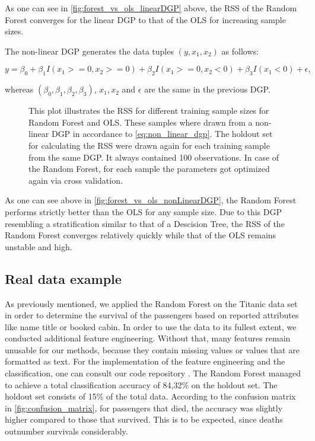 As one can see in \autoref{fig:forest_vs_ols_linearDGP} above, the RSS of the Random Forest converges for the linear DGP
to that of the OLS for increasing sample sizes. 

The non-linear DGP generates the data tuples \( (y, x_{1}, x_{2}) \) as follows:

\begin{equation}\label{eq:non_linear_dgp}
    y = \beta_{0} + \beta_{1} I(x_{1} >= 0, x_{2} >= 0) + \beta_{2} I(x_{1} >= 0, x_{2} < 0) + \beta_{3} I(x_{1} < 0) + \epsilon,
\end{equation}

whereas \( (\beta_{0}, \beta_{1}, \beta_{2}, \beta_{3}) \), \( x_{1}, x_{2} \) and \(  \epsilon \)
are the same in the previous DGP.

\begin{figure}[H]
    \captionsetup{format=plain}
    \caption
        {This plot illustrates the RSS for different training sample sizes for Random Forest and OLS.
        These samples where drawn from a non-linear DGP in accordance to \autoref{eq:non_linear_dgp}.
        The holdout set for calculating the RSS were drawn again for each training sample from the same DGP.
        It always contained 100 observations. In case of the Random Forest, for each sample the parameters
        got optimized again via cross validation.
        }
    \label{fig:forest_vs_ols_nonLinearDGP}
\end{figure}

As one can see above in \autoref{fig:forest_vs_ols_nonLinearDGP}, the Random Forest performs strictly better
than the OLS for any sample size. Due to this DGP resembling a stratification similar to
that of a Descision Tree, the RSS of the Random Forest converges relatively quickly while that of the OLS
remains unstable and high. 


\subsection{Real data example}
\label{sec:real_data}
As previously mentioned, we applied the Random Forest on the Titanic data set \cite{titanicData} in order
to determine the survival of the passengers based on reported attributes like name title or booked cabin. 
In order to use the data to its fullest extent, we conducted additional feature engineering. Without that, many
features remain unusable for our methods, because they contain missing values or values that are formatted as text.
For the implementation of the feature engineering and the classification, one can consult our code repository \cite{githubApplication}.
The Random Forest managed to achieve a total classification accuracy of 84,32\% on the holdout set.
The holdout set consists of 15\% of the total data.
According to the confusion matrix in \autoref{fig:confusion_matrix}, for passengers that died, 
the accuracy was slightly higher compared to those that survived. This is to be expected,
since deaths outnumber survivals considerably.

